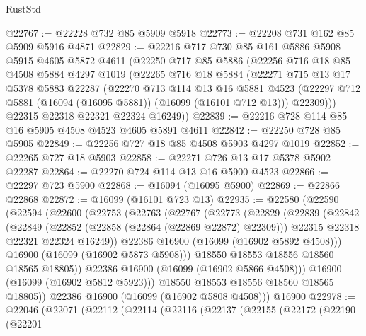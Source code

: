 \begin{lexlean}{RustStd}
\begin{coremodule}
@22767 := @22228 @732 @85 @5909 @5918
@22773 := @22208 @731 @162 @85 @5909 @5916 @4871
@22829 := @22216
    @717
    @730
    @85
    @161
    @5886
    @5908
    @5915
    @4605
    @5872
    @4611
    (@22250
      @717
      @85
      @5886
      (@22256
        @716
        @18
        @85
        @4508
        @5884
        @4297
        @1019
        (@22265
          @716
          @18
          @5884
          (@22271
            @715
            @13
            @17
            @5378
            @5883
            @22287
            (@22270
              @713
              @114
              @13
              @16
              @5881
              @4523
              (@22297 @712 @5881 (@16094 (@16095 @5881)) (@16099 (@16101 @712 @13)))
              @22309)))
        @22315
        @22318
        @22321
        @22324
        @16249))
@22839 := @22216 @728 @114 @85 @16 @5905 @4508 @4523 @4605 @5891 @4611
@22842 := @22250 @728 @85 @5905
@22849 := @22256 @727 @18 @85 @4508 @5903 @4297 @1019
@22852 := @22265 @727 @18 @5903
@22858 := @22271 @726 @13 @17 @5378 @5902 @22287
@22864 := @22270 @724 @114 @13 @16 @5900 @4523
@22866 := @22297 @723 @5900
@22868 := @16094 (@16095 @5900)
@22869 := @22866 @22868
@22872 := @16099 (@16101 @723 @13)
@22935 := @22580
    (@22590
      (@22594
        (@22600
          (@22753
            (@22763
              (@22767
                (@22773
                  (@22829
                    (@22839
                      (@22842
                        (@22849
                          (@22852 (@22858 (@22864 (@22869 @22872) @22309)))
                          @22315
                          @22318
                          @22321
                          @22324
                          @16249))
                      @22386
                      @16900
                      (@16099 (@16902 @5892 @4508)))
                    @16900
                    (@16099 (@16902 @5873 @5908)))
                  @18550
                  @18553
                  @18556
                  @18560
                  @18565
                  @18805))
              @22386
              @16900
              (@16099 (@16902 @5866 @4508)))
            @16900
            (@16099 (@16902 @5812 @5923)))
          @18550
          @18553
          @18556
          @18560
          @18565
          @18805))
      @22386
      @16900
      (@16099 (@16902 @5808 @4508)))
    @16900
@22978 := @22046
    (@22071
      (@22112
        (@22114
          (@22116
            (@22137
              (@22155
                (@22172
                  (@22190
                    (@22201

\end{coremodule}
\end{lexlean}
